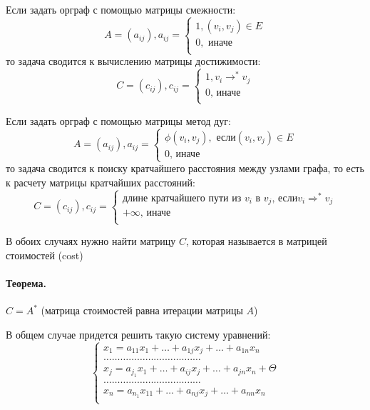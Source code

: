 \documentclass{report}
\newcommand{\pathto}[1][1]{ \Rightarrow^{*}_{#1} }
\begin{document}
\medskip

Если задать орграф с помощью матрицы смежности:
 \[
A = (a_{ij}), a_{ij} = 
\begin{cases}
	1, (v_i,v_j) \in E \\
	0,\mbox{ иначе }\\
\end{cases}
\] 
то задача сводится к вычислению матрицы достижимости:
\[
C = (c_{ij}), c_{ij} = 
\begin{cases}
	1, v_{i} \to ^{*} v_{j} \\
	0\mbox{, иначе} \\
\end{cases}
\] 

\medskip

Если задать орграф с помощью матрицы метод дуг:
\[
A = (a_{ij}), a_{ij} =
\begin{cases}
	\phi(v_{i},v_{j}),\mbox{ если} (v_{i}, v_{j}) \in E \\
	0\mbox{, иначе}
\end{cases}
\] 
то задача сводится к поиску кратчайшего расстояния между узлами графа, то есть к расчету
матрицы кратчайших расстояний:
\[
C = (c_{ij}), c_{ij} =
\begin{cases}
	\mbox{длине кратчайшего пути из $v_{i}$ в $v_{j}$, если} v_{i} \pathto[] v_{j}\\
	+\infty\mbox{, иначе} \\
\end{cases}
\] 

В обоих случаях нужно найти матрицу $C$, которая называется в матрицей стоимостей (cost)

\paragraph*{Теорема.}
$C = A^{*}$ (матрица стоимостей равна итерации матрицы $A$)

В общем случае придется решить такую систему уравнений:
\[
\begin{cases}
	x_1 = a_{11}x_1+\ldots+a_{1j}x_{j}+\ldots+a_{1n}x_{n}\\
	\ldots\ldots\ldots\ldots\ldots\ldots\ldots.\ldots\ldots\ldots.\ldots\\
	x_{j}=a_{j_1}x_1+\ldots+a_{ij}x_{j}+\ldots+a_{jn}x_{n}+\Theta\\
	\ldots\ldots\ldots\ldots\ldots\ldots\ldots.\ldots\ldots\ldots.\ldots\\
	x_{n}=a_{n_1}x_{11}+\ldots+a_{nj}x_{j}+\ldots+a_{nn}x_{n}\\
\end{cases}
\] 
\end{document}
